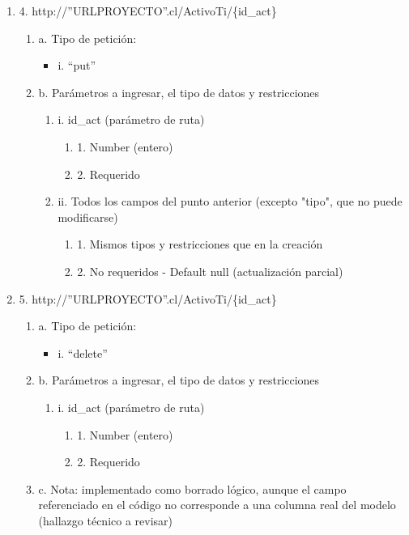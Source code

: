 \begin{enumerate}
    \item 4. http://”URLPROYECTO”.cl/ActivoTi/\{id\_act\}
    \begin{enumerate}
        \item a. Tipo de petición:
            \begin{itemize}
               \item i. “put”
            \end{itemize}
        \item b. Parámetros a ingresar, el tipo de datos y restricciones
            \begin{enumerate}
                \item i. id\_act (parámetro de ruta)
                    \begin{enumerate}
                        \item 1. Number (entero)
                        \item 2. Requerido
                    \end{enumerate}
                \item ii. Todos los campos del punto anterior (excepto "tipo", que no puede modificarse)
                    \begin{enumerate}
                        \item 1. Mismos tipos y restricciones que en la creación
                        \item 2. No requeridos - Default null (actualización parcial)
                    \end{enumerate}
            \end{enumerate}
    \end{enumerate}

    \item 5. http://”URLPROYECTO”.cl/ActivoTi/\{id\_act\}
    \begin{enumerate}
        \item a. Tipo de petición:
            \begin{itemize}
               \item i. “delete”
            \end{itemize}
        \item b. Parámetros a ingresar, el tipo de datos y restricciones
            \begin{enumerate}
                \item i. id\_act (parámetro de ruta)
                    \begin{enumerate}
                        \item 1. Number (entero)
                        \item 2. Requerido
                    \end{enumerate}
            \end{enumerate}
        \item c. Nota: implementado como borrado lógico, aunque el campo referenciado en el código no corresponde a una columna real del modelo (hallazgo técnico a revisar)
    \end{enumerate}
\end{enumerate}

